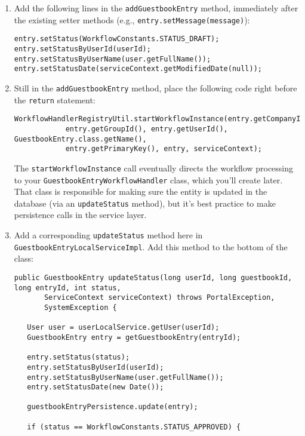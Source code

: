 \begin{enumerate}
\def\labelenumi{\arabic{enumi}.}
\item
  Add the following lines in the \texttt{addGuestbookEntry} method,
  immediately after the existing setter methods (e.g.,
  \texttt{entry.setMessage(message)}):

\begin{verbatim}
entry.setStatus(WorkflowConstants.STATUS_DRAFT);
entry.setStatusByUserId(userId);
entry.setStatusByUserName(user.getFullName());
entry.setStatusDate(serviceContext.getModifiedDate(null));
\end{verbatim}
\item
  Still in the \texttt{addGuestbookEntry} method, place the following
  code right before the \texttt{return} statement:

\begin{verbatim}
WorkflowHandlerRegistryUtil.startWorkflowInstance(entry.getCompanyId(), 
            entry.getGroupId(), entry.getUserId(), GuestbookEntry.class.getName(), 
            entry.getPrimaryKey(), entry, serviceContext);
\end{verbatim}

  The \texttt{startWorkflowInstance} call eventually directs the
  workflow processing to your \texttt{GuestbookEntryWorkflowHandler}
  class, which you'll create later. That class is responsible for making
  sure the entity is updated in the database (via an
  \texttt{updateStatus} method), but it's best practice to make
  persistence calls in the service layer.
\item
  Add a corresponding \texttt{updateStatus} method here in
  \texttt{GuestbookEntryLocalServiceImpl}. Add this method to the bottom
  of the class:

\begin{verbatim}
public GuestbookEntry updateStatus(long userId, long guestbookId, long entryId, int status,
       ServiceContext serviceContext) throws PortalException,
       SystemException {

   User user = userLocalService.getUser(userId);
   GuestbookEntry entry = getGuestbookEntry(entryId);

   entry.setStatus(status);
   entry.setStatusByUserId(userId);
   entry.setStatusByUserName(user.getFullName());
   entry.setStatusDate(new Date());

   guestbookEntryPersistence.update(entry);

   if (status == WorkflowConstants.STATUS_APPROVED) {


\end{verbatim}
\end{enumerate}
